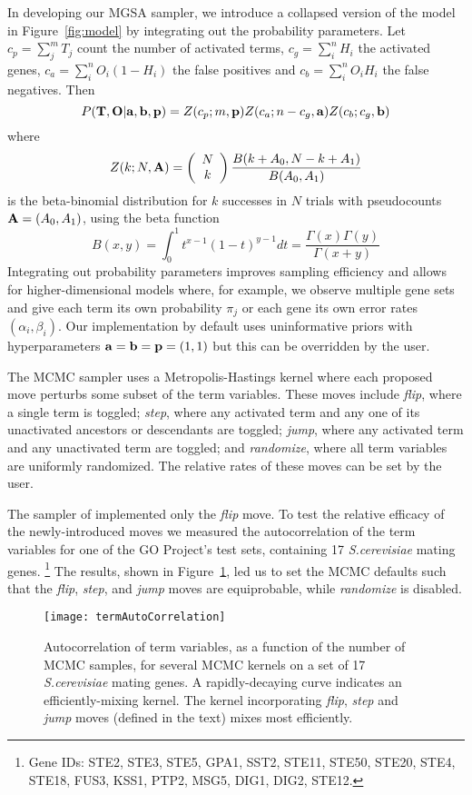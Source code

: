 In developing our MGSA sampler,
we introduce a collapsed version of the model in Figure~\ref{fig:model} by integrating out the probability parameters.
Let $c_p = \sum_j^m T_j$ count the number of activated terms,
$c_g = \sum_i^n H_i$ the activated genes,
$c_a = \sum_i^n O_i(1-H_i)$ the false positives and
$c_b = \sum_i^n O_i H_i$ the false negatives.
Then
\[
P({\bf T},{\bf O}|{\bf a},{\bf b},{\bf p}) =
Z(c_p;m,{\bf p})
Z(c_a;n-c_g,{\bf a})
Z(c_b;c_g,{\bf b})
\]
where
\[
Z(k;N,{\bf A}) =
\left( \begin{array}{c} N \\ k \end{array} \right)
\frac{B(k+A_0,N-k+A_1)}{B(A_0,A_1)}
\]
is the beta-binomial distribution for $k$ successes in $N$ trials with pseudocounts ${\bf A}=(A_0,A_1)$,
using the beta function
\[
B(x,y) = \int_0^1 t^{x-1}(1-t)^{y-1} dt = \frac{\Gamma(x)\Gamma(y)}{\Gamma(x+y)}
\]
Integrating out probability parameters improves sampling efficiency
and allows for higher-dimensional models where, for example, we observe multiple gene sets
and give each term its own probability $\pi_j$
or each gene its own error rates $(\alpha_i, \beta_i)$.
Our implementation by default uses uninformative priors with hyperparameters ${\bf a}={\bf b}={\bf p}=(1,1)$
but this can be overridden by the user.

The MCMC sampler uses a Metropolis-Hastings kernel where each proposed move perturbs some subset of the term variables.
These moves include {\em flip}, where a single term is toggled;
{\em step}, where any activated term and any one of its unactivated ancestors or descendants are toggled;
{\em jump}, where any activated term and any unactivated term are toggled; and
{\em randomize}, where all term variables are uniformly randomized.
The relative rates of these moves can be set by the user.

The sampler of \cite{pmid20172960} implemented only the {\em flip} move.
To test the relative efficacy of the newly-introduced moves we measured the autocorrelation of the term variables
for one of the GO Project's test sets, containing 17 {\em S.cerevisiae} mating genes.
\footnote{Gene IDs: STE2, STE3, STE5, GPA1, SST2, STE11, STE50, STE20, STE4, STE18, FUS3, KSS1, PTP2, MSG5, DIG1, DIG2, STE12.}
The results, shown in Figure~\ref{fig:termauto}, led us to set the MCMC defaults such that
the {\em flip}, {\em step}, and {\em jump} moves are equiprobable,
while {\em randomize} is disabled.

\begin{figure}
\texttt{[image: termAutoCorrelation]}
\caption{
  \label{fig:termauto}
  Autocorrelation of term variables, as a function of the number of MCMC samples, for several MCMC kernels on a set of 17 {\em S.cerevisiae} mating genes.
  A rapidly-decaying curve indicates an efficiently-mixing kernel.
  The kernel incorporating {\em flip}, {\em step} and {\em jump} moves (defined in the text) mixes most efficiently.
}
\end{figure}

